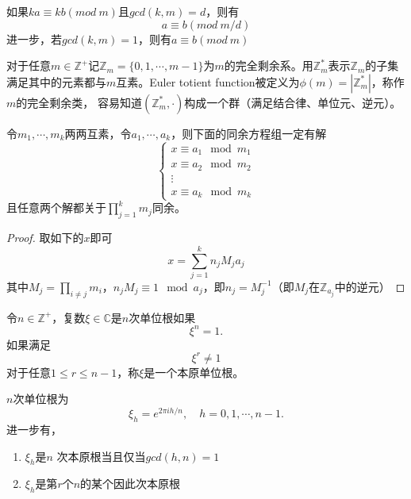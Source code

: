 \begin{proposition}
	如果$ka\equiv kb(mod\ m)$且$gcd(k, m) = d$，则有
	\begin{equation*}
		a\equiv b (mod\ m/d)
	\end{equation*}
	进一步，若$gcd(k, m) = 1$，则有$a\equiv b (mod\ m)$
\end{proposition}
\begin{definition}
	对于任意$m\in\mathbb{Z}^+$记$\mathbb{Z}_m = \{0, 1,\cdots, m-1\}$为$m$的完全剩余系。用$\mathbb{Z}_m^*$表示$\mathbb{Z}_m$的子集满足其中的元素都与$m$互素。Euler totient function被定义为$\phi(m) = |\mathbb{Z}_m^*|$，称作$m$的完全剩余类， 容易知道$(\mathbb{Z}_m^*,\cdot)$构成一个群（满足结合律、单位元、逆元）。
\end{definition}
\begin{theorem}
	令$m_1, \cdots, m_k$两两互素，令$a_1, \cdots, a_k$，则下面的同余方程组一定有解
	\begin{equation*}
		\begin{cases}
			x \equiv a_1\mod m_1\\
			x \equiv a_2\mod m_2\\ 
			\vdots \\
			x \equiv a_k\mod m_k
		\end{cases}
	\end{equation*}
	且任意两个解都关于$\prod_{j=1}^km_j$同余。
\end{theorem}
\begin{proof}
	取如下的$x$即可
	\begin{equation*}
		x = \sum\limits_{j=1}^k n_j M_j a_j
	\end{equation*}
	其中$M_j=\prod\limits_{i\neq j}m_i$，$n_jM_j\equiv 1\mod a_j$，即$n_j=M_j^{-1}$（即$M_j$在$\mathbb{Z}_{a_j}$中的逆元）
\end{proof}
\begin{definition}[本原单位根]
	令$n\in \mathbb{Z^+}$，复数$\xi\in \mathbb{C}$是$n$次单位根如果
	\begin{equation*}
		\xi^n = 1.
	\end{equation*}
	如果满足
	\begin{equation*}
		\xi^r \neq 1
	\end{equation*}
	对于任意$1\leq r\leq n-1$，称$\xi$是一个本原单位根。
\end{definition}
\begin{proposition}
	$n$次单位根为
	\begin{equation*}
		\xi_h = e^{2\pi ih/n},\quad h = 0,1,\cdots, n-1.
	\end{equation*}
进一步有，\begin{enumerate}
	\item $\xi_h$是$n$ 次本原根当且仅当$gcd(h, n) = 1$
	\item $\xi_h$是第$r$个$n$的某个因此次本原根
\end{enumerate}
\end{proposition}
